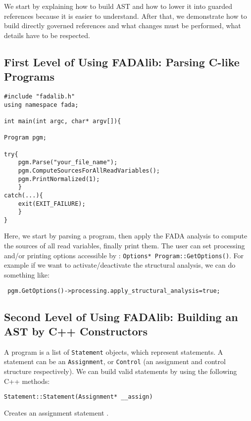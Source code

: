 We start by explaining how to build AST and how to lower it into guarded references because it is easier to understand. After that, we demonstrate how to build directly governed references and what changes must be performed, what details have to be respected.

\subsection{First Level of Using FADAlib: Parsing C-like Programs}

\begin{footnotesize}
\begin{lstlisting}[frame=single,framerule=0pt]
#include "fadalib.h"
using namespace fada;

int	main(int argc, char* argv[]){

Program pgm;

try{
	pgm.Parse("your_file_name");
	pgm.ComputeSourcesForAllReadVariables();
	pgm.PrintNormalized(1);
	}
catch(...){
	exit(EXIT_FAILURE);
	}
}
\end{lstlisting}

\end{footnotesize}

Here, we start by parsing a program, then apply the FADA analysis to compute the sources of all read variables, finally print them. The user can set processing and/or printing options accessible by : \verb|Options* Program::GetOptions()|. For example if we want to activate/deactivate the structural analysis, we can do something like:
\begin{verbatim}
 pgm.GetOptions()->processing.apply_structural_analysis=true;
\end{verbatim}


\subsection{Second Level of Using FADAlib: Building an AST by C++ Constructors}
A program is a list of \verb|Statement| objects, which represent statements. A statement can be an \verb|Assignment|, or \verb|Control| (an assignment and control structure respectively). We can build valid statements by using the following C++ methods:

\begin{lstlisting}[frame=single,framerule=0pt]
Statement::Statement(Assignment* __assign) 
\end{lstlisting}
Creates an assignment statement .\\


